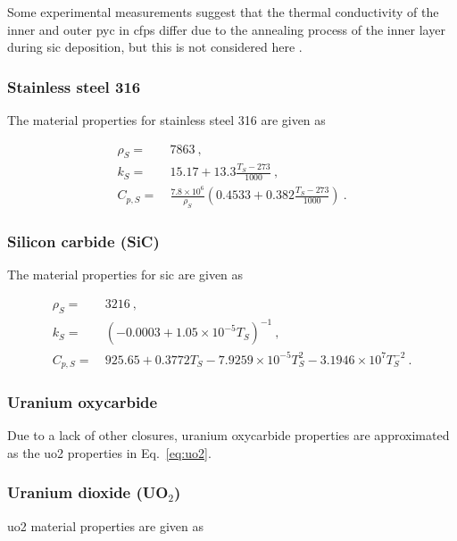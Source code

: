 \begin{appendices}
\noindent Some experimental measurements suggest that the thermal conductivity of the inner and outer \gls{pyc} in \glspl{cfp} differ due to the annealing process of the inner layer during \gls{sic} deposition, but this is not considered here \cite{slack,bokros,rochais,basini,lopez_honorato}. 

\subsubsection*{Stainless steel 316}
The material properties for stainless steel 316 are given as \cite{tinte2}

\begin{subequations}
\begin{align}
\rho_S=&\ 7863\ ,\\
\label{eq:k_Ss}
k_S =&\ 15.17+13.3\frac{T_S-273}{1000}\ , \\
\label{eq:cp_ss}
C_{p,S} =&\ \frac{7.8\times 10^6}{\rho_S}\left(0.4533+0.382\frac{T_S-273}{1000}\right)\ .
\end{align}
\end{subequations}

\subsubsection*{Silicon carbide (SiC)}
The material properties for \gls{sic} are given as \cite{snead,xin_wang_thesis,tecdoc1694,sun}

\begin{subequations}
\begin{align}
\rho_S=&\ 3216\ ,\\
k_S =&\ \left(-0.0003+1.05\times10^{-5}T_S\right)^{-1}\ ,\\ 
\label{eq:CpSiC}
C_{p,S} =&\ 925.65+0.3772T_S-7.9259\times10^{-5}T_S^2-3.1946\times10^7T_S^{-2}\ .
\end{align}
\end{subequations}

\subsubsection*{Uranium oxycarbide}
Due to a lack of other closures, uranium oxycarbide properties are approximated as the \gls{uo2} properties in Eq.\ \eqref{eq:uo2}.

\subsubsection*{Uranium dioxide (UO$_2$)}
\gls{uo2} material properties are given as


\end{appendices}
